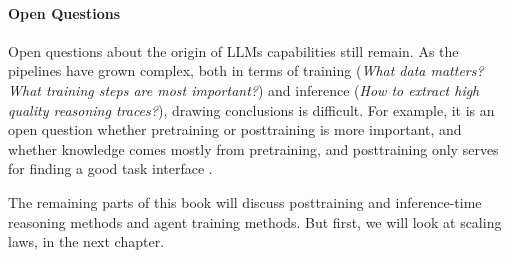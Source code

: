 \paragraph{Open Questions}
Open questions about the origin of  LLMs capabilities still remain. As the pipelines have grown complex, both in terms of training ({\em What data matters? What training steps are most important?}) and inference ({\em How to extract high quality reasoning traces?}), drawing  conclusions is difficult. For example, it is an open question whether pretraining or posttraining is more important, and whether knowledge comes mostly from pretraining, and posttraining only serves for finding a good task interface \citep{zhou2023lima}.

The remaining parts of this book will discuss posttraining and inference-time reasoning methods and agent training methods. But first, we will look at scaling laws, in the next chapter. 




